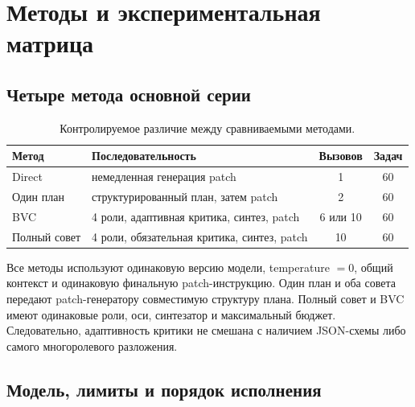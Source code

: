 \documentclass[11pt]{article}
\begin{document}
\section{Методы и экспериментальная матрица}

\subsection{Четыре метода основной серии}

\begin{table}[H]
\centering
\caption{Контролируемое различие между сравниваемыми методами.}
\label{tab:methods}
\begin{tabularx}{\textwidth}{@{}lXcc@{}}
\toprule
Метод & Последовательность & Вызовов & Задач\\
\midrule
Direct & немедленная генерация patch & 1 & 60\\
Один план & структурированный план, затем patch & 2 & 60\\
BVC & 4 роли, адаптивная критика, синтез, patch & 6 или 10 & 60\\
Полный совет & 4 роли, обязательная критика, синтез, patch & 10 & 60\\
\bottomrule
\end{tabularx}
\end{table}

Все методы используют одинаковую версию модели, temperature \(=0\), общий
контекст и одинаковую финальную patch-инструкцию. Один план и оба совета
передают patch-генератору совместимую структуру плана. Полный совет и BVC
имеют одинаковые роли, оси, синтезатор и максимальный бюджет. Следовательно,
адаптивность критики не смешана с наличием JSON-схемы либо самого
многоролевого разложения.

\subsection{Модель, лимиты и порядок исполнения}
\end{document}
